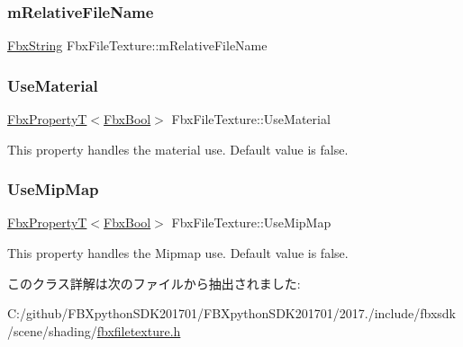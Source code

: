 \mbox{\label{class_fbx_file_texture_ab42081ef2be0913cc666b9aca03c7373}} 
\subsubsection{\texorpdfstring{m\+Relative\+File\+Name}{mRelativeFileName}}
{\footnotesize\ttfamily \hyperlink{class_fbx_string}{Fbx\+String} Fbx\+File\+Texture\+::m\+Relative\+File\+Name\hspace{0.3cm}{\ttfamily [protected]}}

\mbox{\label{class_fbx_file_texture_a404cc00d81d3645071cb475b0b822c59}} 
\subsubsection{\texorpdfstring{Use\+Material}{UseMaterial}}
{\footnotesize\ttfamily \hyperlink{class_fbx_property_t}{Fbx\+PropertyT}$<$\hyperlink{fbxtypes_8h_a92e0562b2fe33e76a242f498b362262e}{Fbx\+Bool}$>$ Fbx\+File\+Texture\+::\+Use\+Material}

This property handles the material use. Default value is false. \mbox{\label{class_fbx_file_texture_ab7dd18dfbaf20ce668f5443ac7b5d2ec}} 
\subsubsection{\texorpdfstring{Use\+Mip\+Map}{UseMipMap}}
{\footnotesize\ttfamily \hyperlink{class_fbx_property_t}{Fbx\+PropertyT}$<$\hyperlink{fbxtypes_8h_a92e0562b2fe33e76a242f498b362262e}{Fbx\+Bool}$>$ Fbx\+File\+Texture\+::\+Use\+Mip\+Map}

This property handles the Mipmap use. Default value is false. 

このクラス詳解は次のファイルから抽出されました\+:\begin{DoxyCompactItemize}
\item 
C\+:/github/\+F\+B\+Xpython\+S\+D\+K201701/\+F\+B\+Xpython\+S\+D\+K201701/2017./include/fbxsdk/scene/shading/\hyperlink{fbxfiletexture_8h}{fbxfiletexture.\+h}\end{DoxyCompactItemize}
